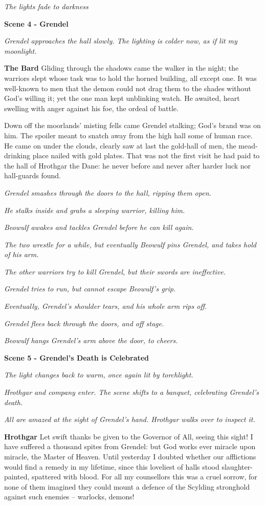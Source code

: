 \documentclass[a4paper]{article}
\begin{document}
{\centerline{\textit{The lights fade to darkness}}

\centerline{\textbf{Scene 4 - Grendel}}
\centerline{\textit{Grendel approaches the hall slowly. The lighting is colder now, as if lit my moonlight.}}

\textbf{The Bard} Gliding through the shadows came
the walker in the night; the warriors slept
whose task was to hold the horned building,
all except one. It was well-known to men
that the demon could not drag them to the shades
without God’s willing it; yet the one man kept
unblinking watch. He awaited, heart swelling
with anger against his foe, the ordeal of battle.

Down off the moorlands’ misting fells came
Grendel stalking; God’s brand was on him.
The spoiler meant to snatch away
from the high hall some of human race.
He came on under the clouds, clearly saw at last
the gold-hall of men, the mead-drinking place
nailed with gold plates. That was not the first visit
he had paid to the hall of Hrothgar the Dane:
he never before and never after
harder luck nor hall-guards found.

\centerline{\textit{Grendel smashes through the doors to the hall, ripping them open.}}
\centerline{\textit{He stalks inside and grabs a sleeping warrior, killing him.}}
\centerline{\textit{Beowulf awakes and tackles Grendel before he can kill again.}}
\centerline{\textit{The two wrestle for a while, but eventually Beowulf pins Grendel, and takes hold of his arm.}}
\centerline{\textit{The other warriors try to kill Grendel, but their swords are ineffective.}}
\centerline{\textit{Grendel tries to run, but cannot escape Beowulf's grip.}}
\centerline{\textit{Eventually, Grendel's shoulder tears, and his whole arm rips off.}}
\centerline{\textit{Grendel flees back through the doors, and off stage.}}
\centerline{\textit{Beowulf hangs Grendel's arm above the door, to cheers.}}

\centerline{\textbf{Scene 5 - Grendel's Death is Celebrated}}
\centerline{\textit{The light changes back to warm, once again lit by torchlight.}}
\centerline{\textit{Hrothgar and company enter. The scene shifts to a banquet, celebrating Grendel's death.}}
\centerline{\textit{All are amazed at the sight of Grendel's hand. Hrothgar walks over to inspect it.}}

\textbf{Hrothgar} Let swift thanks be given to the Governor of All,
seeing this sight! I have suffered a thousand
spites from Grendel: but God works ever
miracle upon miracle, the Master of Heaven.
Until yesterday I doubted whether
our afflictions would find a remedy
in my lifetime, since this loveliest of halls
stood slaughter-painted, spattered with blood.
For all my counsellors this was a cruel sorrow,
for none of them imagined they could mount a defence
of the Scylding stronghold against such enemies –
warlocks, demons!

}
\end{document}
